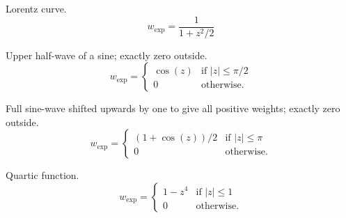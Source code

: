 \begin{codelist}
\begin{table}
\begin{codelist}
    \item[\itempar{lorentz \\ lorentzian}]\itemend
      Lorentz curve.
      \begin{equation}\label{equ:weight:lorentz}
      w_{\mathrm{exp}} = \frac{1}{1 + z^2 / 2}
      \end{equation}

    \item[\itempar{halfsine \\ half-sine}]\itemend
      Upper half-wave of a sine; exactly zero outside.
      \begin{equation}\label{equ:weight:halfsine}
      w_{\mathrm{exp}} =
      \left\{\begin{array}{cl}
      \cos(z) & \mbox{if } |z| \leq \pi/2 \\
      0       & \mbox{otherwise.}
      \end{array}\right.
      \end{equation}

    \item[\itempar{fullsine \\ full-sine}]\itemend
      Full sine-wave shifted upwards by one to give all positive weights; exactly zero outside.
      \begin{equation}\label{equ:weight:fullsine}
      w_{\mathrm{exp}} =
      \left\{\begin{array}{cl}
      (1 + \cos(z)) / 2 & \mbox{if } |z| \leq \pi \\
      0                 & \mbox{otherwise.}
      \end{array} \right.
      \end{equation}

    \item[\itempar{bisquare \\ bi-square}]\itemend
      Quartic function.
      \begin{equation}\label{equ:weight:bisquare}
      w_{\mathrm{exp}} =
      \left\{
      \begin{array}{cl}
        1 - z^4 & \mbox{if } |z| \leq 1 \\
        0       & \mbox{otherwise.}
      \end{array}
      \right.
      \end{equation}
    \end{codelist}


\end{table}
\end{codelist}
